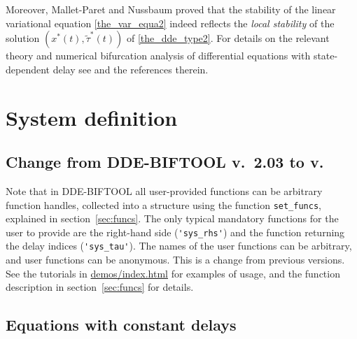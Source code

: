 \documentclass[10pt]{scrartcl}
\newcommand{\DDEBIFCODE}{\textsc{DDE-BIFTOOL}}
\newcommand{\demobase}{\url{demos/index.html}}
\newcommand{\blist}[1]{\mbox{\lstinline!#1!}}
\begin{document}

Moreover, Mallet-Paret and Nussbaum \cite{MN11} proved that the
stability of the linear variational equation \eqref{the_var_equa2}
indeed reflects the {\it local stability} of the solution
$(x^*(t),\tilde{\tau}^*(t))$ of \eqref{the_dde_type2}. 
For details on the relevant theory and numerical bifurcation analysis
of differential equations with state-dependent delay see
\cite{luz01,HKWW06} and the references therein.

\section{System definition}\label{sec:system:def}
\subsection{Change from \DDEBIFCODE{} v.~2.03 to
  v.~\version} Note that in \DDEBIFCODE{} \version{} all
user-provided functions can be arbitrary function handles, collected
into a structure using the function \blist{set_funcs}, explained in
section~\ref{sec:funcs}. The only typical mandatory functions for the
user to provide are the right-hand side (\blist{'sys_rhs'}) and the
function returning the delay indices (\blist{'sys_tau'}). The names of
the user functions can be arbitrary, and user functions can be
anonymous. This is a change from previous versions. See the tutorials
in \demobase{} for examples of usage, and the function description in
section~\ref{sec:funcs} for details.
\subsection{Equations with constant delays}\label{sys_def1}
\end{document}
